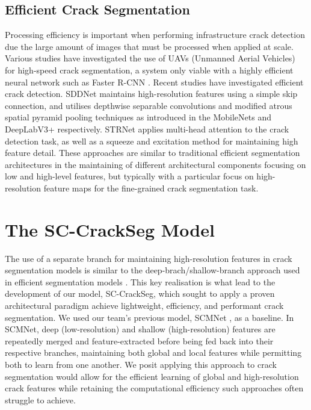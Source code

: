 \documentclass[a4paper,12pt]{report}
\begin{document}
\subsection{Efficient Crack Segmentation}
Processing efficiency is important when performing infrastructure crack detection due the large amount of images that must be processed when applied at scale. Various studies \cite{kerle_uav-based_2020} \cite{kang_autonomous_2018} have investigated the use of UAVs (Unmanned Aerial Vehicles) for high-speed crack segmentation, a system only viable with a highly efficient neural network such as Faster R-CNN \cite{ali_real-time_2021}. Recent studies have investigated efficient crack detection. SDDNet \cite{choi_sddnet_2019} maintains high-resolution features using a simple skip connection, and utilises depthwise separable convolutions and modified atrous spatial pyramid pooling techniques as introduced in the MobileNets \cite{howard_mobilenets_2017} and DeepLabV3+ \cite{chen_rethinking_2017} respectively. STRNet \cite{kang_efficient_2021} applies multi-head attention to the crack detection task, as well as a squeeze and excitation method for maintaining high feature detail.
These approaches are similar to traditional efficient segmentation architectures in the maintaining of different architectural components focusing on low and high-level features, but typically with a particular focus on high-resolution feature maps for the fine-grained crack segmentation task.

\section{The SC-CrackSeg Model}



The use of a separate branch for maintaining high-resolution features in crack segmentation models \cite{nayyeri_multi-resolution_2021} is similar to the deep-brach/shallow-branch approach used in efficient segmentation models \cite{yu_bisenet_2018} \cite{poudel_contextnet_2018}. This key realisation is what lead to the development of our model, SC-CrackSeg, which sought to apply a proven architectural paradigm achieve lightweight, efficiency, and performant crack segmentation. We used our team's previous model, SCMNet \cite{singha_scmnet_2021}, as a baseline. In SCMNet, deep (low-resolution) and shallow (high-resolution) features are repeatedly merged and feature-extracted before being fed back into their respective branches, maintaining both global and local features while permitting both to learn from one another. We posit applying this approach to crack segmentation would allow for the efficient learning of global and high-resolution crack features while retaining the computational efficiency such approaches often struggle to achieve.
\end{document}
